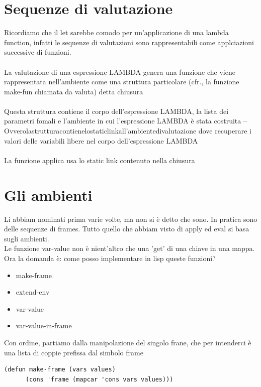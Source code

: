 \documentclass[12pt, a4paper, openany, oneside]{book}
\begin{document}
\section{Sequenze di valutazione}
Ricordiamo che il let sarebbe comodo per un'applicazione di una lambda function,
infatti le sequenze di valutazioni sono rappresentabili come applciazioni 
successive di funzioni.
\paragraph{}La valutazione di una espressione LAMBDA genera una funzione che 
viene rappresentata nell’ambiente come una struttura particolare (cfr., la 
funzione make-fun chiamata da valuta) detta chiusura

\paragraph{}
Questa struttura contiene il corpo dell’espressione LAMBDA, la lista dei 
parametri fomali e l’ambiente in cui l’espressione
LAMBDA è stata costruita
– Ovverolastrutturacontienelostaticlinkall’ambientedivalutazione dove recuperare 
i valori delle variabili libere nel corpo dell’espressione LAMBDA
\paragraph{}
La funzione applica usa lo static link contenuto nella chiusura
\section{Gli ambienti}
Li abbiam nominati prima varie volte, ma non si è detto che sono. In pratica sono
delle sequenze di frames. Tutto quello che abbiam visto di apply ed eval si 
basa sugli ambienti. \\
Le funzione var-value non è nient’altro che una 'get' di una chiave in una mappa.
Ora la domanda è: come posso implementare in lisp queste funzioni?
\begin{itemize}
	\item make-frame
	\item extend-env
	\item var-value
	\item var-value-in-frame
\end{itemize}
Con ordine, partiamo dalla manipolazione del singolo frane, che per intenderci
è una lista di coppie prefissa dal simbolo frame
\begin{lstlisting}[language=LISP]
	(defun make-frame (vars values)
      (cons 'frame (mapcar 'cons vars values)))
\end{lstlisting}
\end{document}
